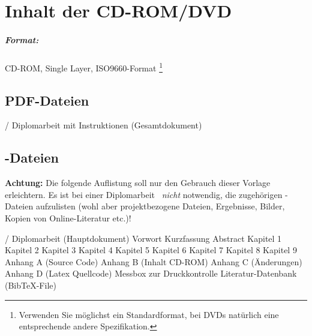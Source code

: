 \chapter{Inhalt der CD-ROM/DVD}
\label{app:cdrom}

\paragraph{Format:} 
		CD-ROM, Single Layer, ISO9660-Format%
\footnote{Verwenden Sie möglichst ein Standardformat, bei DVDs natürlich
eine entsprechende andere Spezifikation.}


\section{PDF-Dateien}
\begin{FileList}{/}
 Diplomarbeit mit Instruktionen (Gesamtdokument)
%
\end{FileList}


\section{\latex-Dateien}

\textbf{Achtung:} Die folgende Auflistung soll nur den Gebrauch dieser Vorlage
erleichtern. Es ist bei einer Diplomarbeit \ia\ \emph{nicht} notwendig, die zugehörigen \latex-Dateien aufzulisten (wohl aber projektbezogene Dateien, Ergebnisse, Bilder, Kopien von Online-Literatur etc.)!
\begin{FileList}{/}
 Diplomarbeit (Hauptdokument) %
 Vorwort %
 Kurzfassung %
 Abstract %
 Kapitel 1 %
 Kapitel 2 %
 Kapitel 3
 Kapitel 4 %
 Kapitel 5 %
 Kapitel 6 %
 Kapitel 7 %
 Kapitel 8 %
 Kapitel 9 %
 Anhang A (Source Code) %
 Anhang B (Inhalt CD-ROM) %
 Anhang C (Änderungen) %
 Anhang D (Latex Quellcode) %
 Messbox zur Druckkontrolle %
 Literatur-Datenbank (BibTeX-File)
\end{FileList}

